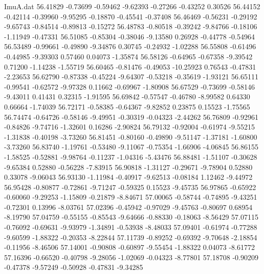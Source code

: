 \begin{filecontents}{ImuA.dat}
  56.41829   -0.73699   -0.59462   -9.62393   -0.27266   -0.43252    0.30526
  56.44152   -0.42114   -0.39960   -9.95295   -0.18870   -0.45541   -0.37408
  56.46469   -0.56231   -0.29192   -9.65743   -0.84514   -0.89813   -0.15272
  56.48783   -0.80518   -0.39242   -9.84766   -0.18106   -1.11949   -0.47331
  56.51085   -0.85304   -0.38046   -9.13580    0.26928   -0.44778   -0.54964
  56.53489   -0.99661   -0.49890   -9.34876    0.30745   -0.24932   -1.02288
  56.55808   -0.61496   -0.44985   -9.39303    0.57460    0.04073   -1.35874
  56.58126   -0.64965   -0.67358   -9.39542    0.71200   -1.14238   -1.55719
  56.60465   -0.81476   -0.49053  -10.25923    0.76543   -0.47831   -2.23653
  56.62790   -0.87338   -0.45224   -9.64307   -0.53218   -0.35619   -1.93121
  56.65111   -0.99541   -0.62572   -9.97328    0.11662   -0.69967   -1.80908
  56.67529   -0.73699   -0.58146   -9.43011    0.41431    0.32315   -1.91595
  56.69842   -0.57547   -0.46780   -8.99582    0.64330    0.66664   -1.74039
  56.72171   -0.58385   -0.64367   -9.82852    0.23875    0.15523   -1.75565
  56.74474   -0.64726   -0.58146   -9.49951   -0.30319   -0.04323   -2.44262
  56.76809   -0.92961   -0.84826   -9.74716   -1.32601    0.16286   -2.90824
  56.79132   -0.92004   -0.61974   -9.55215   -1.31838   -0.40198   -3.73260
  56.81451   -0.80160   -0.49890   -9.51147   -1.37181   -1.60800   -3.73260
  56.83740   -1.19761   -0.53480   -9.11067   -0.75354   -1.66906   -4.06845
  56.86155   -1.58525   -0.52881   -9.98764   -0.11237   -1.04316   -5.43476
  56.88481   -1.51107   -0.30628   -9.65384    0.52880   -0.56228   -7.83915
  56.90818   -1.31127   -0.29671   -9.78904    0.52880    0.33078   -9.06043
  56.93130   -1.11984   -0.40917   -9.62513   -0.08184    1.12462   -9.44972
  56.95428   -0.80877   -0.72861   -9.71247   -0.59325    0.15523   -9.45735
  56.97865   -0.65922   -0.60060   -9.29253   -1.15809   -0.21879   -8.84671
  57.00065   -0.58744   -0.74895   -9.43251   -0.72301    0.13996   -8.03761
  57.02396   -0.45942   -0.97029   -9.45763   -0.80697    0.68954   -8.19790
  57.04759   -0.55155   -0.85543   -9.64666   -0.88330   -0.18063   -8.56429
  57.07115   -0.76092   -0.69631   -9.93979   -1.34891   -0.53938   -8.48033
  57.09401   -0.61974   -0.77288   -9.60599   -1.88322   -0.20353   -8.22844
  57.11739   -0.89252   -0.69392   -9.70648   -2.18854   -0.11956   -8.46506
  57.14001   -0.90808   -0.60897   -9.55454   -1.88322    0.04073   -8.61772
  57.16396   -0.66520   -0.40798   -9.28056   -1.02069   -0.04323   -8.77801
  57.18708   -0.90209   -0.47378   -9.57249   -0.50928   -0.47831   -9.34285

\end{filecontents}
